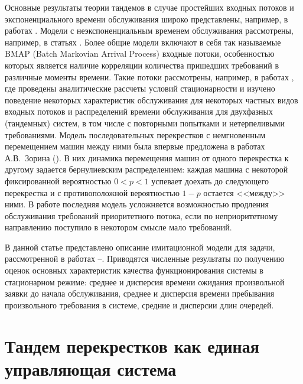 \documentclass[11pt]{ubs}
\begin{document}
Основные результаты теории тандемов в случае простейших входных потоков и экспоненциального времени обслуживания широко представлены, например, в работах \cite{Balsamo:2003, Gnedenko:Konig:1983, Perros:1994}. Модели с неэкспоненциальным временем обслуживания рассмотрены, например, в статьях \cite{Gomez:2002:1, Gomez:2002:2, Gomez:2002:3}. Более общие модели включают в себя так называемые BMAP (Batch Markovian Arrival Process) входные потоки, особенностью которых является наличие корреляции количества пришедших требований в различные моменты времени. Такие потоки рассмотрены, например, в работах \cite{Klimenok:Dudin:2005,Klimenok:Dudin:2004, Klimenok:2010, Klimenok:2011, Klimenok:2015}, где проведены аналитические рассчеты условий стационарности и изучено поведение некоторых характеристик обслуживания для некоторых частных видов входных потоков и распределений времени обслуживания для двухфазных (тандемных) систем, в том числе с повторными попытками и нетерпеливыми требованиями. 
Модель последовательных перекрестков с немгновенным перемещением машин между ними была впервые предложена в работах А.В.~Зорина (\cite{Zorine:2010, Zorine:2011:2, Zorine:2012}). В них динамика перемещения машин от одного перекрестка к другому задается бернулиевским распределением: каждая машина с некоторой фиксированной вероятностью $0<p<1$ успевает доехать до следующего перекрестка и с противоположной вероятностью $1-p$ остается <<между>> ними. В работе \cite{Kocheganov:2017:1} последняя модель усложняется возможностью продления обслуживания требований приоритетного потока, если по неприоритетному направлению поступило в некотором смысле мало требований. 

В данной статье представлено описание имитационной модели для задачи, рассмотренной в работах \cite{Kocheganov:2017:3}--\cite{Kocheganov:2017:2}. Приводятся численные результаты по получению оценок основных характеристик качества функционирования системы в стационарном режиме: среднее  и дисперсия времени ожидания произвольной заявки до начала обслуживания, среднее  и дисперсия времени пребывания произвольного требования в системе, средние и дисперсии длин очередей.





\section{Тандем перекрестков как единая управляющая система}
\end{document}

